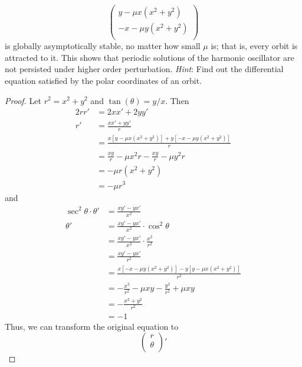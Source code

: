 \documentclass[../psets.tex]{subfiles}
\begin{document}
\begin{enumerate}
\begin{enumerate}
\begin{equation*}
\begin{pmatrix}
                y-\mu x(x^2+y^2)\\
                -x-\mu y(x^2+y^2)\\
            \end{pmatrix}
        \end{equation*}
        is globally asymptotically stable, no matter how small $\mu$ is; that is, every orbit is attracted to it. This shows that periodic solutions of the harmonic oscillator are not persisted under higher order perturbation. \emph{Hint}: Find out the differential equation satisfied by the polar coordinates of an orbit.
        \begin{proof}
            Let $r^2=x^2+y^2$ and $\tan(\theta)=y/x$. Then
            \begin{align*}
                2rr' &= 2xx'+2yy'\\
                r' &= \frac{xx'+yy'}{r}\\
                &= \frac{x[y-\mu x(x^2+y^2)]+y[-x-\mu y(x^2+y^2)]}{r}\\
                &= \frac{xy}{r}-\mu x^2r-\frac{xy}{r}-\mu y^2r\\
                &= -\mu r(x^2+y^2)\\
                &= -\mu r^3
            \end{align*}
            and
            \begin{align*}
                \sec^2\theta\cdot\theta' &= \frac{xy'-yx'}{x^2}\\
                \theta' &= \frac{xy'-yx'}{x^2}\cdot\cos^2\theta\\
                &= \frac{xy'-yx'}{x^2}\cdot\frac{x^2}{r^2}\\
                &= \frac{xy'-yx'}{r^2}\\
                &= \frac{x[-x-\mu y(x^2+y^2)]-y[y-\mu x(x^2+y^2)]}{r^2}\\
                &= -\frac{x^2}{r^2}-\mu xy-\frac{y^2}{r^2}+\mu xy\\
                &= -\frac{x^2+y^2}{r^2}\\
                &= -1
            \end{align*}
            Thus, we can transform the original equation to
            \begin{equation*}
                \begin{pmatrix}
                    r\\
                    \theta\\
                \end{pmatrix}'

\end{equation*}
\end{proof}
\end{enumerate}
\end{enumerate}
\end{document}
